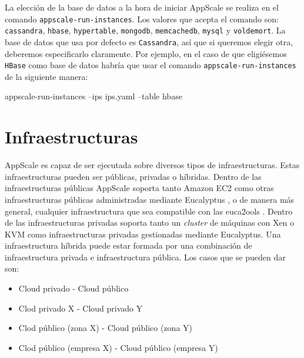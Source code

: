 La elección de la base de datos a la hora de iniciar AppScale se realiza en el comando \texttt{appscale-run-instances}. Los valores que acepta el comando son: \texttt{cassandra}, \texttt{hbase}, \texttt{hypertable}, \texttt{mongodb}, \texttt{memcachedb}, \texttt{mysql} y \texttt{voldemort}. La base de datos que usa por defecto es \texttt{Cassandra}, así que si queremos elegir otra, deberemos especificarlo claramente. Por ejemplo, en el caso de que eligiésemos \texttt{HBase} como base de datos habría que usar el comando \texttt{appscale-run-instances} de la siguiente manera:

\begin{bashcode}
appscale-run-instances --ips ips.yaml --table hbase
\end{bashcode}


\section{Infraestructuras}

AppScale es capaz de ser ejecutada sobre diversos tipos de infraestructuras. Estas infraestructuras pueden ser públicas, privadas o híbridas. Dentro de las infraestructuras públicas AppScale soporta tanto Amazon EC2 \cite{amazon-ec2} como otras infraestructuras públicas administradas mediante Eucalyptus \cite{eucalyptus}, o de manera más general, cualquier infraestructura que sea compatible con las euca2ools \cite{eucalyptus-euca2ools}. Dentro de las infraestructuras privadas soporta tanto un \emph{cluster} de máquinas con Xen o KVM como infraestructuras privadas gestionadas mediante Eucalyptus. Una infraestructura híbrida puede estar formada por una combinación de infraestructura privada e infraestructura pública. Los casos que se pueden dar son:

\begin{itemize}
\item Cloud privado - Cloud público
\item Clod privado X - Cloud privado Y
\item Clod público (zona X) - Cloud público (zona Y)
\item Clod público (empresa X) - Cloud público (empresa Y)
\end{itemize}
